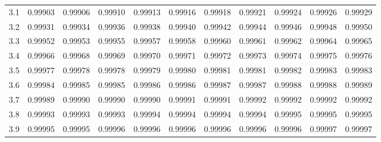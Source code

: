 \documentclass{article}
\begin{document}
\begin{center}
\begin{tabular}{*{11}{M{12.9mm}}}
3.1 & 0.99903 & 0.99906 & 0.99910 & 0.99913 & 0.99916 & 0.99918 & 0.99921 & 0.99924 & 0.99926 & 0.99929\\
3.2 & 0.99931 & 0.99934 & 0.99936 & 0.99938 & 0.99940 & 0.99942 & 0.99944 & 0.99946 & 0.99948 & 0.99950\\
3.3 & 0.99952 & 0.99953 & 0.99955 & 0.99957 & 0.99958 & 0.99960 & 0.99961 & 0.99962 & 0.99964 & 0.99965\\
3.4 & 0.99966 & 0.99968 & 0.99969 & 0.99970 & 0.99971 & 0.99972 & 0.99973 & 0.99974 & 0.99975 & 0.99976\\
3.5 & 0.99977 & 0.99978 & 0.99978 & 0.99979 & 0.99980 & 0.99981 & 0.99981 & 0.99982 & 0.99983 & 0.99983\\
3.6 & 0.99984 & 0.99985 & 0.99985 & 0.99986 & 0.99986 & 0.99987 & 0.99987 & 0.99988 & 0.99988 & 0.99989\\
3.7 & 0.99989 & 0.99990 & 0.99990 & 0.99990 & 0.99991 & 0.99991 & 0.99992 & 0.99992 & 0.99992 & 0.99992\\
3.8 & 0.99993 & 0.99993 & 0.99993 & 0.99994 & 0.99994 & 0.99994 & 0.99994 & 0.99995 & 0.99995 & 0.99995\\
3.9 & 0.99995 & 0.99995 & 0.99996 & 0.99996 & 0.99996 & 0.99996 & 0.99996 & 0.99996 & 0.99997 & 0.99997\\
\bottomrule
    \end{tabular}
  \end{center}
\end{document}

